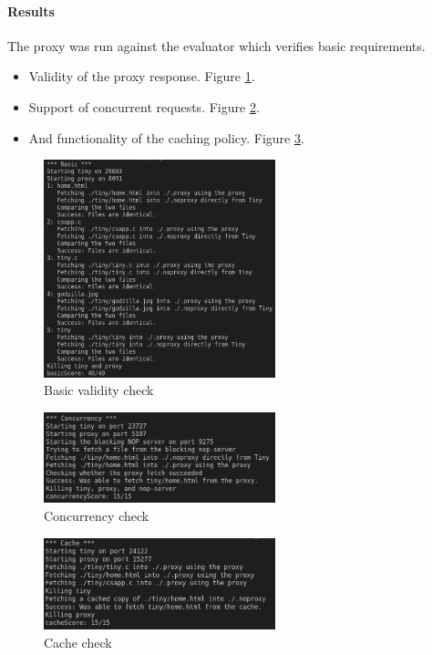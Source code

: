 \documentclass{article}
\begin{document}
\paragraph{Results}
The proxy was run against the evaluator which verifies basic requirements. 
\begin{itemize}
    \item Validity of the proxy response. Figure \ref{fig:basic}.
    \item Support of concurrent requests. Figure \ref{fig:concurrency}.
    \item And functionality of the caching policy. Figure \ref{fig:cache}.
\end{itemize}
\begin{figure}[h]
    \includegraphics[width=0.6\textwidth]{basic.jpg}
    \centering
    \caption{Basic validity check}
    \label{fig:basic}
\end{figure}
\begin{figure}[h]
    \includegraphics[width=0.6\textwidth]{concurrency.jpg}
    \centering
    \caption{Concurrency check}
    \label{fig:concurrency}
\end{figure}
\begin{figure}[h]
    \includegraphics[width=0.6\textwidth]{cache.jpg}
    \centering
    \caption{Cache check}
    \label{fig:cache}
\end{figure}
\end{document}
